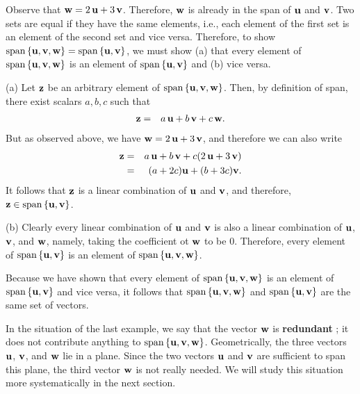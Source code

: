 \begin{solution}
  Observe that $\mbox{\bf w} = 2\,\mbox{\bf u}+3\,\mbox{\bf v}$. Therefore,
  $\mbox{\bf w}$ is already in the span of $\mbox{\bf u}$ and $\mbox{\bf v}$.  Two
  sets are equal if they have the same elements, i.e., each element of
  the first set is an element of the second set and vice
  versa. Therefore, to show
  $\sspan\set{\vect{u},\vect{v},\vect{w}} =
  \sspan\set{\vect{u},\vect{v}}$, we must show (a) that every element
  of $\sspan\set{\vect{u},\vect{v},\vect{w}}$ is an element of
  $\sspan\set{\vect{u},\vect{v}}$ and (b) vice versa.

  (a) Let $\mbox{\bf z}$ be an arbitrary element of
  $\sspan\set{\vect{u},\vect{v},\vect{w}}$. Then, by definition of
  span, there exist scalars $a,b,c$ such that
  \begin{eqnarray*}
    \mbox{\bf z} &=& a\,\mbox{\bf u} + b\,\mbox{\bf v} + c\,\mbox{\bf w}.
  \end{eqnarray*}
  But as observed above, we have $\mbox{\bf w} = 2\,\mbox{\bf u}+3\,\mbox{\bf v}$,
  and therefore we can also write
  \begin{eqnarray*}
    \mbox{\bf z}
    &=& a\,\mbox{\bf u} + b\,\mbox{\bf v} + c(2\,\mbox{\bf u}+3\,\mbox{\bf v})\\
    &=& (a+2c)\mbox{\bf u} + (b+3c)\mbox{\bf v}.
  \end{eqnarray*}
  It follows that $\mbox{\bf z}$ is a linear combination of $\mbox{\bf u}$ and
  $\mbox{\bf v}$, and therefore, $\vect{z}\in \sspan\set{\vect{u},\vect{v}}$. 

  (b) Clearly every linear combination of $\mbox{\bf u}$ and $\mbox{\bf v}$ is
  also a linear combination of $\mbox{\bf u}$, $\mbox{\bf v}$, and $\mbox{\bf w}$,
  namely, taking the coefficient ot $\mbox{\bf w}$ to be $0$. Therefore,
  every element of $\sspan\set{\vect{u},\vect{v}}$ is an element of
  $\sspan\set{\vect{u},\vect{v},\vect{w}}$.

  Because we have shown that every element of
  $\sspan\set{\vect{u},\vect{v},\vect{w}}$ is an element of
  $\sspan\set{\vect{u},\vect{v}}$ and vice versa, it follows that
  $\sspan\set{\vect{u},\vect{v},\vect{w}}$ and
  $\sspan\set{\vect{u},\vect{v}}$ are the same set of vectors.
\end{solution}

In the situation of the last example, we say that the vector
$\mbox{\bf w}$ is \textbf{redundant}%
; it does not
contribute anything to
$\sspan\set{\vect{u},\vect{v},\vect{w}}$. Geometrically, the three
vectors $\mbox{\bf u}$, $\mbox{\bf v}$, and $\mbox{\bf w}$ lie in a plane. Since
the two vectors $\mbox{\bf u}$ and $\mbox{\bf v}$ are sufficient to span this
plane, the third vector $\mbox{\bf w}$ is not really needed. We will study
this situation more systematically in the next section. 

